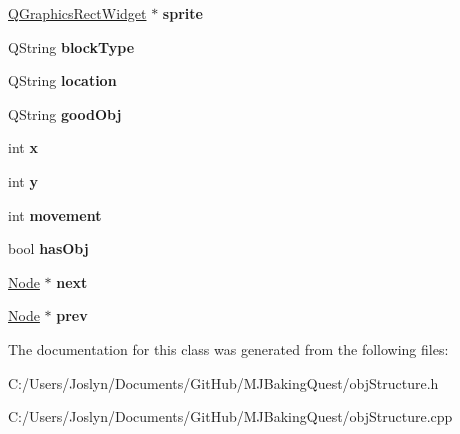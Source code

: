 \begin{DoxyCompactItemize}
\item 
\hypertarget{class_node_a1e3b8be9dd5e9e8ee1515a954eb2a440}{\hyperlink{class_q_graphics_rect_widget}{Q\-Graphics\-Rect\-Widget} $\ast$ {\bfseries sprite}}\label{class_node_a1e3b8be9dd5e9e8ee1515a954eb2a440}

\item 
\hypertarget{class_node_ab67926654974b599162a1d92a8782e77}{Q\-String {\bfseries block\-Type}}\label{class_node_ab67926654974b599162a1d92a8782e77}

\item 
\hypertarget{class_node_a554bf618b49a998f092af1afd298223e}{Q\-String {\bfseries location}}\label{class_node_a554bf618b49a998f092af1afd298223e}

\item 
\hypertarget{class_node_a5e1262ea866e559c23dac491e1a007c4}{Q\-String {\bfseries good\-Obj}}\label{class_node_a5e1262ea866e559c23dac491e1a007c4}

\item 
\hypertarget{class_node_aff1029a518bdc2651007b8856f958364}{int {\bfseries x}}\label{class_node_aff1029a518bdc2651007b8856f958364}

\item 
\hypertarget{class_node_aa3e5b5240023b4528ae85057b3324202}{int {\bfseries y}}\label{class_node_aa3e5b5240023b4528ae85057b3324202}

\item 
\hypertarget{class_node_a6273ae8d26c9b5e8aa400ed25938bd39}{int {\bfseries movement}}\label{class_node_a6273ae8d26c9b5e8aa400ed25938bd39}

\item 
\hypertarget{class_node_af695bd07e0f4b58d85c4ac2fd48cdfa6}{bool {\bfseries has\-Obj}}\label{class_node_af695bd07e0f4b58d85c4ac2fd48cdfa6}

\item 
\hypertarget{class_node_a2559a716f69ccaa76d648d9f1b83065e}{\hyperlink{class_node}{Node} $\ast$ {\bfseries next}}\label{class_node_a2559a716f69ccaa76d648d9f1b83065e}

\item 
\hypertarget{class_node_a632ea91c6a13082308f7692649a68880}{\hyperlink{class_node}{Node} $\ast$ {\bfseries prev}}\label{class_node_a632ea91c6a13082308f7692649a68880}

\end{DoxyCompactItemize}


The documentation for this class was generated from the following files\-:\begin{DoxyCompactItemize}
\item 
C\-:/\-Users/\-Joslyn/\-Documents/\-Git\-Hub/\-M\-J\-Baking\-Quest/obj\-Structure.\-h\item 
C\-:/\-Users/\-Joslyn/\-Documents/\-Git\-Hub/\-M\-J\-Baking\-Quest/obj\-Structure.\-cpp\end{DoxyCompactItemize}
